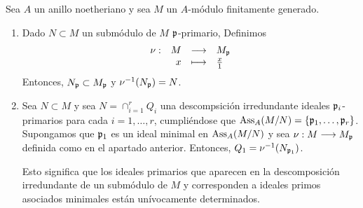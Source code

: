 \documentclass[../main.tex]{subfiles}
\begin{document}
\begin{theorem}
Sea $A$ un anillo noetheriano y sea $M$ un $A$-módulo finitamente generado.\begin{enumerate}
    \item Dado $N\subset M$ un submódulo de $M$ $\mathfrak{p}$-primario, Definimos
    $$\begin{array}{rrcl}
	\nu:&M&\longrightarrow&M_{\mathfrak{p}}\\
	&x&\longmapsto&\frac{x}{1}\\ \end{array}$$ Entonces, $N_{\mathfrak{p}}\subset M_{\mathfrak{p}}$ y $\nu^{-1}(N_{\mathfrak{p}})=N$.
	\item Sea $N\subset M$ y sea $N=\cap_{i=1}^rQ_i$ una descompsición irredundante ideales $\mathfrak{p}_i$-primarios para cada $i=1,\dots,r$, cumpliéndose que $\text{Ass}_A(M/N)=\{\mathfrak{p}_1,\dots,\mathfrak{p}_r\}$. Supongamos que $\mathfrak{p}_1$ es un ideal minimal en $\text{Ass}_A(M/N)$ y sea $\nu:M\longrightarrow M_{\mathfrak{p}}$ definida como en el apartado anterior. Entonces, $Q_1=\nu^{-1}(N_{\mathfrak{p}_1})$.

	Esto significa que los ideales primarios que aparecen en la descomposición irredundante de un submódulo de $M$ y corresponden a ideales primos asociados minimales están unívocamente determinados.
\end{enumerate}
\end{theorem}
\end{document}
